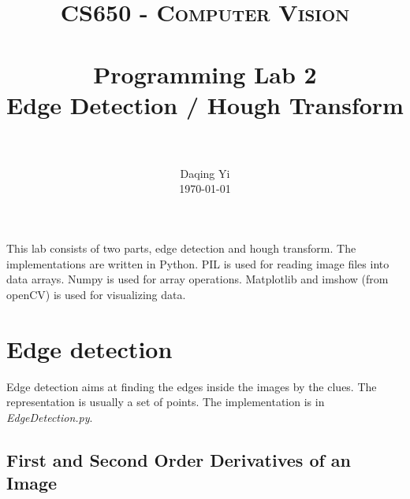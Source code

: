\documentclass[paper=a4, fontsize=11pt]{scrartcl}
\title{
		\usefont{OT1}{bch}{b}{n}
		\normalfont \normalsize \textsc{CS650 - Computer Vision} \\ [25pt]
		\horrule{0.5pt} \\[0.4cm]
		\huge Programming Lab 2 \\ Edge Detection / Hough Transform \\
		\horrule{2pt} \\[0.5cm]
}
\author{
		\normalfont 								\normalsize
        Daqing Yi\\[-3pt]		\normalsize
        \today
}
\date{}
\begin{document}
\maketitle

This lab consists of two parts, edge detection and hough transform.
The implementations are written in Python.
PIL is used for reading image files into data arrays.
Numpy is used for array operations.
Matplotlib and imshow (from openCV) is used for visualizing data.

\section{Edge detection}

Edge detection aims at finding the edges inside the images by the clues.
The representation is usually a set of points.
The implementation is in \emph{EdgeDetection.py}.

\subsection{First and Second Order Derivatives of an Image}
\end{document}
